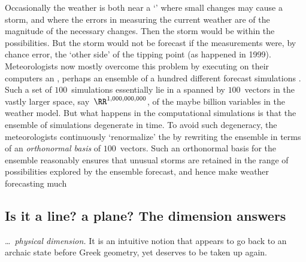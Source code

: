 Occasionally the weather is both near a `' where small changes may cause a storm, and where the errors in measuring the current weather are of the magnitude of the necessary changes.
Then the storm would be within the possibilities. 
But the storm would not be forecast if the measurements were, by chance error, the `other side' of the tipping point (as happened in 1999).
Meteorologists now mostly overcome this problem by executing on their computers an , perhaps an ensemble of a hundred different forecast simulations \cite[pp.274--80, e.g.]{Roulstone2013}.
Such a set of \(100\)~simulations essentially lie in a  spanned by \(100\)~vectors in the vastly larger space, say~\(\RR^{1,000,000,000}\), of the maybe billion variables in the weather model.
But what happens in the computational simulations is that the ensemble of simulations degenerate in time.
To avoid such degeneracy, the meteorologists continuously `renormalize' the  by rewriting the ensemble in terms of an \emph{orthonormal basis} of \(100\)~vectors.
Such an orthonormal basis for the ensemble reasonably ensures that unusual storms are retained in the range of possibilities explored by the ensemble forecast, and hence make weather forecasting much 





\subsection{Is it a line? a plane? The dimension answers}


\begin{quoted}{\cite{Mandelbrot1982}}
\ldots\ \emph{physical dimension.} It is an intuitive notion that appears to go back to an archaic state before Greek geometry, yet deserves to be taken up again.
\end{quoted}

